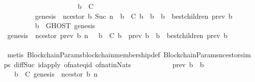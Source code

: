 \begin{isabellebody}
\ \ \ \ \ \ \ \ \isamarkupfalse%
\ {\isachardoublequoteopen}{\isasymsigma}\ {\isasymin}\ {\isasymSigma}{\isachardoublequoteclose}\isanewline
\ \ \ \ \ \ \ \ \ {\isachardoublequoteopen}b\ {\isasymin}\ C{\isachardoublequoteclose}\isanewline
\ \ \ \ \ \ \ \ \ {\isachardoublequoteopen}genesis\ {\isacharequal}\ n{\isacharunderscore}cestor\ {\isacharparenleft}b{\isacharcomma}\ Suc\ n{\isacharparenright}\ {\isasymand}\ {\isacharparenleft}{\isasymforall}b{\isacharprime}\ {\isasymin}\ C{\isachardot}\ b{\isacharprime}\ {\isasymdownharpoonright}\ b\ {\isasymlongrightarrow}\ b{\isacharprime}\ {\isasymin}\ best{\isacharunderscore}children\ {\isacharparenleft}prev\ b{\isacharprime}{\isacharcomma}\ {\isasymsigma}{\isacharparenright}{\isacharparenright}{\isachardoublequoteclose}\isanewline
\ \ \ \ \ \ \ \ \ {\isachardoublequoteopen}b{\isacharprime}{\isacharprime}\ {\isasymin}\ GHOST\ {\isacharparenleft}{\isacharbraceleft}genesis{\isacharbraceright}{\isacharcomma}\ {\isasymsigma}{\isacharparenright}{\isachardoublequoteclose}\isanewline
\ \ \ \ \ \ \ \ \isamarkupfalse%
\ \isamarkupfalse%
\ {\isachardoublequoteopen}genesis\ {\isacharequal}\ n{\isacharunderscore}cestor\ {\isacharparenleft}prev\ b{\isacharcomma}\ n{\isacharparenright}\ {\isasymand}\ {\isacharparenleft}{\isasymforall}\ b{\isacharprime}\ {\isasymin}\ C{\isachardot}\ b{\isacharprime}\ {\isasymdownharpoonright}\ prev\ b\ {\isasymlongrightarrow}\ b{\isacharprime}\ {\isasymin}\ best{\isacharunderscore}children\ {\isacharparenleft}prev\ b{\isacharprime}{\isacharcomma}\ {\isasymsigma}{\isacharparenright}{\isacharparenright}{\isachardoublequoteclose}\isanewline
\ \ \ \ \ \ \ \ \ \ \isamarkupfalse%
\ {\isacharparenleft}metis\ BlockchainParams{\isachardot}blockchain{\isacharunderscore}membership{\isacharunderscore}def\ BlockchainParams{\isachardot}n{\isacharunderscore}cestor{\isachardot}simps{\isacharparenleft}{}{\isacharparenright}\ diff{\isacharunderscore}Suc{\isacharunderscore}{}\ id{\isacharunderscore}apply\ of{\isacharunderscore}nat{\isacharunderscore}eq{\isacharunderscore}id\ of{\isacharunderscore}nat{\isacharunderscore}in{\isacharunderscore}Nats{\isacharparenright}\isanewline
\ \ \ \ \ \ \ \ \isamarkupfalse%
\ \isamarkupfalse%
\ {\isachardoublequoteopen}prev\ b\ {\isasymdownharpoonright}\ b{\isacharprime}{\isacharprime}{\isachardoublequoteclose}\isanewline
\ \ \ \ \ \ \ \ \ \ \isamarkupfalse%
\ {\isacartoucheopen}{\isasymforall}{\isasymsigma}{\isasymin}{\isasymSigma}{\isachardot}\ {\isasymforall}\ b\ {\isasymin}\ C{\isachardot}\ genesis\ {\isacharequal}\ n{\isacharunderscore}cestor\ {\isacharparenleft}b{\isacharcomma}\ n{\isacharparenright}\ {\isasymand}\isanewline

\end{isabellebody}
